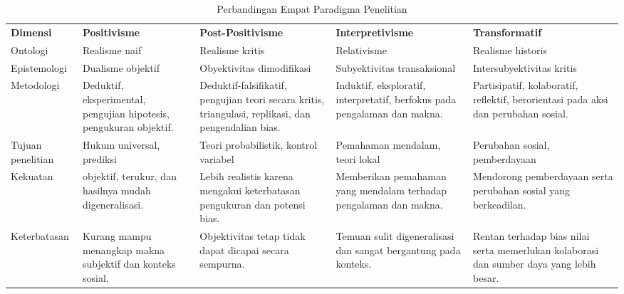 \documentclass[
  indonesian,
  letterpaper,
  DIV=11,
  numbers=noendperiod]{scrreprt}
\begin{document}
\begin{longtable}[]{@{}
  >{\raggedright\arraybackslash}p{}
  >{\raggedright\arraybackslash}p{}
  >{\raggedright\arraybackslash}p{}
  >{\raggedright\arraybackslash}p{}
  >{\raggedright\arraybackslash}p{}@{}}
\caption{Perbandingan Empat Paradigma
Penelitian}\label{tbl-komparasiparadigma}\tabularnewline
\toprule\noalign{}
\endfirsthead
\endhead
\bottomrule\noalign{}
\endlastfoot
\textbf{Dimensi} & \textbf{Positivisme} & \textbf{Post-Positivisme} &
\textbf{Interpretivisme} & \textbf{Transformatif} \\
Ontologi & Realisme naif & Realisme kritis & Relativisme & Realisme
historis \\
Epistemologi & Dualisme objektif & Obyektivitas dimodifikasi &
Subyektivitas transaksional & Intersubyektivitas kritis \\
Metodologi & Deduktif, eksperimental, pengujian hipotesis, pengukuran
objektif. & Deduktif-falsifikatif, pengujian teori secara kritis,
triangulasi, replikasi, dan pengendalian bias. & Induktif, eksploratif,
interpretatif, berfokus pada pengalaman dan makna. & Partisipatif,
kolaboratif, reflektif, berorientasi pada aksi dan perubahan sosial. \\
Tujuan penelitian & Hukum universal, prediksi & Teori probabilistik,
kontrol variabel & Pemahaman mendalam, teori lokal & Perubahan sosial,
pemberdayaan \\
Kekuatan & objektif, terukur, dan hasilnya mudah digeneralisasi. & Lebih
realistis karena mengakui keterbatasan pengukuran dan potensi bias. &
Memberikan pemahaman yang mendalam terhadap pengalaman dan makna. &
Mendorong pemberdayaan serta perubahan sosial yang berkeadilan. \\
Keterbatasan & Kurang mampu menangkap makna subjektif dan konteks
sosial. & Objektivitas tetap tidak dapat dicapai secara sempurna. &
Temuan sulit digeneralisasi dan sangat bergantung pada konteks. & Rentan
terhadap bias nilai serta memerlukan kolaborasi dan sumber daya yang
lebih besar. \\
\end{longtable}
\end{document}
